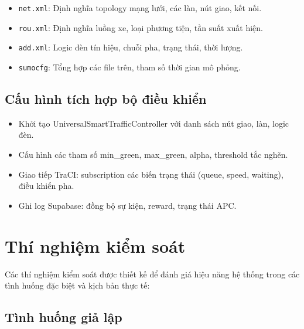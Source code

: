 \begin{itemize}
    \item \texttt{net.xml}: Định nghĩa topology mạng lưới, các làn, nút giao, kết nối.
    \item \texttt{rou.xml}: Định nghĩa luồng xe, loại phương tiện, tần suất xuất hiện.
    \item \texttt{add.xml}: Logic đèn tín hiệu, chuỗi pha, trạng thái, thời lượng.
    \item \texttt{sumocfg}: Tổng hợp các file trên, tham số thời gian mô phỏng.
\end{itemize}

\subsection{Cấu hình tích hợp bộ điều khiển}

\begin{itemize}
    \item Khởi tạo UniversalSmartTrafficController với danh sách nút giao, làn, logic đèn.
    \item Cấu hình các tham số min\_green, max\_green, alpha, threshold tắc nghẽn.
    \item Giao tiếp TraCI: subscription các biến trạng thái (queue, speed, waiting), điều khiển pha.
    \item Ghi log Supabase: đồng bộ sự kiện, reward, trạng thái APC.
\end{itemize}

\section{Thí nghiệm kiểm soát}

Các thí nghiệm kiểm soát được thiết kế để đánh giá hiệu năng hệ thống trong các tình huống đặc biệt và kịch bản thực tế:

\subsection{Tình huống giả lập}

